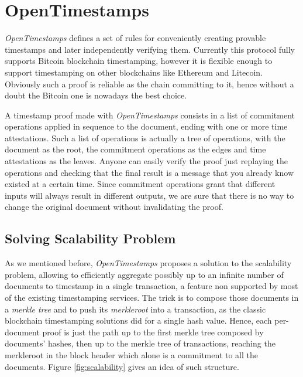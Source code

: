 \bigskip
\section{OpenTimestamps}
\label{sec:ots}
\textit{OpenTimestamps} defines a set of rules for conveniently creating provable timestamps and later independently verifying them. Currently this protocol fully supports Bitcoin blockchain timestamping, however it is flexible enough to support timestamping on other blockchains like Ethereum and Litecoin. Obviously such a proof is reliable as the chain committing to it, hence without a doubt the Bitcoin one is nowadays the best choice.

\bigskip
\noindent
A timestamp proof made with \textit{OpenTimestamps} consists in a list of commitment operations applied in sequence to the document, ending with one or more time attestations. Such a list of operations is actually a tree of operations, with the document as the root, the commitment operations as the edges and time attestations as the leaves. Anyone can easily verify the proof just replaying the operations and checking that the final result is a message that you already know existed at a certain time. Since commitment operations grant that different inputs will always result in different outputs, we are sure that there is no way to change the original document without invalidating the proof.

\bigskip
\subsection{Solving Scalability Problem}
As we mentioned before, \textit{OpenTimestamps} proposes a solution to the scalability problem, allowing to efficiently aggregate possibly up to an infinite number of documents to timestamp in a single transaction, a feature non supported by most of the existing timestamping services. The trick is to compose those documents in a \textit{merkle tree} and to push its \textit{merkleroot} into a transaction, as the classic blockchain timestamping solutions did for a single hash value. Hence, each per-document proof is just the path up to the first merkle tree composed by documents' hashes, then up to the merkle tree of transactions, reaching the merkleroot in the block header which alone is a commitment to all the documents. Figure \ref{fig:scalability} gives an idea of such structure.

